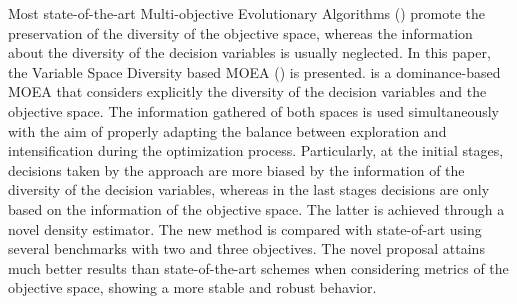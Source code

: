 Most state-of-the-art Multi-objective Evolutionary Algorithms (\MOEAS{}) promote the preservation of the diversity 
of the objective space, whereas the information about the diversity of the decision variables is usually neglected.
%
In this paper, the Variable Space Diversity based MOEA (\VSDMOEA{}) is presented.
%
\VSDMOEA{} is a dominance-based MOEA that considers explicitly the diversity of the decision variables and the objective space.
%
The information gathered of both spaces is used simultaneously with the aim of properly adapting the balance between exploration
and intensification during the optimization process.
%
Particularly, at the initial stages, decisions taken by the approach are more biased by the information of the diversity of 
the decision variables, whereas in the last stages decisions are only based on the information of the objective space.
%
The latter is achieved through a novel density estimator.
%
The new method is compared with state-of-art \MOEAS{} using several benchmarks with two and three objectives.
%
The novel proposal attains much better results than state-of-the-art schemes when considering metrics of the objective space, 
showing a more stable and robust behavior.
